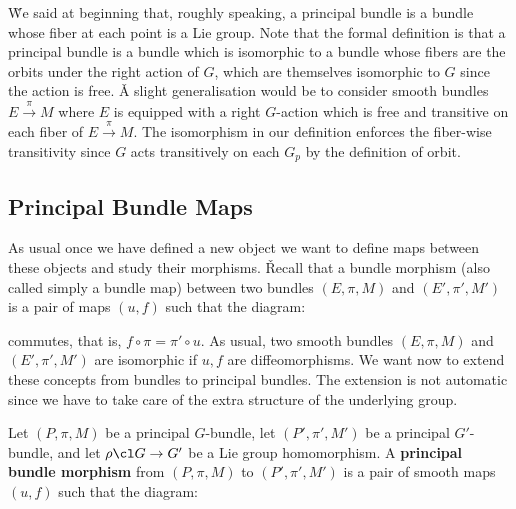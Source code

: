 \v

We said at beginning that, roughly speaking, a principal bundle is a bundle whose fiber at each point is a Lie group.
Note that the formal definition is that a principal bundle is a bundle which is isomorphic to a bundle whose fibers
are the orbits under the right action of $G$, which are themselves isomorphic to $G$ since the action is free. \v

A slight generalisation would be to consider smooth bundles $E\xrightarrow{\,\pi\,}M$ where $E$ is equipped with a
right $G$-action which is free and transitive on each fiber of $E\xrightarrow{\,\pi\,}M$. The isomorphism in our
definition enforces the fiber-wise transitivity since $G$ acts transitively on each $G_p$ by the definition of orbit.

\subsection{Principal Bundle Maps}

As usual once we have defined a new object we want to define maps between these objects and study their morphisms. \v

Recall that a bundle morphism (also called simply a bundle map) between two bundles $(E,\pi,M)$ and $(E',\pi',M')$ is
a pair of maps $(u,f)$ such that the diagram:
\bse
{}
\ese

commutes, that is, $f\circ \pi = \pi' \circ u$. As usual, two smooth bundles $(E,\pi,M)$ and $(E',\pi',M')$ are
isomorphic if $u,f$ are diffeomorphisms. We want now to extend these concepts from bundles to principal bundles. The
extension is not automatic since we have to take care of the extra structure of the underlying group.

Let $(P,\pi,M)$ be a principal $G$-bundle, let $(P',\pi',M')$ be a principal $G'$-bundle, and let $\rho\cl G \to G'$
be a Lie group homomorphism. A \textbf{principal bundle morphism} from $(P,\pi,M)$ to $ (P',\pi',M')$ is a pair of
smooth maps $(u,f)$ such that the diagram:
\bse
{}
\ese

